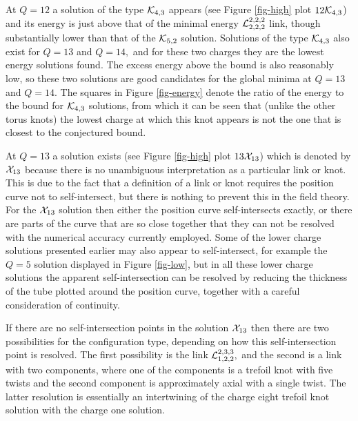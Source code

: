 \documentclass[12pt]{article}
\begin{document}
At $Q=12$ a solution of the type ${\cal K}_{4,3}$ appears (see
Figure \ref{fig-high}
 plot $12{\cal K}_{4,3}$) and its energy is just above that
of the minimal energy ${\cal L}_{2,2,2}^{2,2,2}$ link, though
substantially lower than that of the ${\cal K}_{5,2}$ solution.
Solutions of the type ${\cal K}_{4,3}$ also exist for $Q=13$ and
$Q=14,$ and for these two charges they are the lowest energy
solutions found. The excess energy above the bound is also
reasonably low, so these two solutions are good candidates for the
global minima at $Q=13$ and $Q=14.$  The squares in 
Figure \ref{fig-energy} denote
the ratio of the energy to the bound for ${\cal K}_{4,3}$ solutions, from
which it can be seen that (unlike the other torus knots) 
the lowest charge at which this knot
appears is not the one that is closest to the conjectured bound.

At $Q=13$ a solution exists (see Figure \ref{fig-high} plot $13{\cal X}_{13}$)
which is denoted by ${\cal X}_{13}$ because there is no unambiguous
interpretation as a particular link or knot. This is due to the fact
that a definition of a link or knot requires the position curve not
to self-intersect, but there is nothing to prevent this in the field
theory. For the ${\cal X}_{13}$ solution then either the position
curve self-intersects exactly, or there are parts of the curve
that are so close together that they can not be resolved with the
numerical accuracy currently employed. Some of the lower charge
solutions presented earlier may also appear to self-intersect, for
example the $Q=5$ solution displayed in Figure \ref{fig-low}, but in all these
lower charge solutions the apparent self-intersection can be
resolved by reducing the thickness of the tube plotted around the
position curve, together with a careful consideration of continuity.

If there are no self-intersection points in the solution ${\cal
X}_{13}$ then there are two possibilities for the configuration
type, depending on how this self-intersection point is resolved. The
first possibility is the link ${\cal L}_{1,2,2}^{2,3,3},$ and the
second is a link with two components, where one of the components is
a trefoil knot with five twists and the second component is approximately
axial with a single twist. The latter resolution is essentially 
an intertwining of the charge eight trefoil knot solution with the charge
one solution.
    
\end{document}
